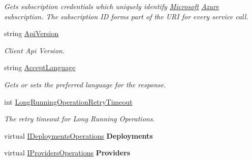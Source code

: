 \begin{DoxyCompactItemize}
\begin{DoxyCompactList}\small\item\em Gets subscription credentials which uniquely identify \hyperlink{namespace_microsoft}{Microsoft} \hyperlink{namespace_microsoft_1_1_azure}{Azure} subscription. The subscription ID forms part of the U\+RI for every service call. \end{DoxyCompactList}\item 
string \hyperlink{class_microsoft_1_1_azure_1_1_management_1_1_resources_1_1_resource_management_client_aea51a4e00dde5b781e6f692e1ae2bc46}{Api\+Version}
\begin{DoxyCompactList}\small\item\em Client Api Version. \end{DoxyCompactList}\item 
string \hyperlink{class_microsoft_1_1_azure_1_1_management_1_1_resources_1_1_resource_management_client_af3643c8e63b7c9f85c7c323f216f08c9}{Accept\+Language}
\begin{DoxyCompactList}\small\item\em Gets or sets the preferred language for the response. \end{DoxyCompactList}\item 
int \hyperlink{class_microsoft_1_1_azure_1_1_management_1_1_resources_1_1_resource_management_client_ad3b245357fb89a925bcec2c0cc6fe300}{Long\+Running\+Operation\+Retry\+Timeout}
\begin{DoxyCompactList}\small\item\em The retry timeout for Long Running Operations. \end{DoxyCompactList}\item 
virtual \hyperlink{interface_microsoft_1_1_azure_1_1_management_1_1_resources_1_1_i_deployments_operations}{I\+Deployments\+Operations} {\bfseries Deployments}\hypertarget{class_microsoft_1_1_azure_1_1_management_1_1_resources_1_1_resource_management_client_aaba91c1c3605e83d38a6a6f03f15c5e4}{}\label{class_microsoft_1_1_azure_1_1_management_1_1_resources_1_1_resource_management_client_aaba91c1c3605e83d38a6a6f03f15c5e4}

\item 
virtual \hyperlink{interface_microsoft_1_1_azure_1_1_management_1_1_resources_1_1_i_providers_operations}{I\+Providers\+Operations} {\bfseries Providers}\hypertarget{class_microsoft_1_1_azure_1_1_management_1_1_resources_1_1_resource_management_client_a0db61f31aa1e02dd057e99bb75c4ffe2}{}\label{class_microsoft_1_1_azure_1_1_management_1_1_resources_1_1_resource_management_client_a0db61f31aa1e02dd057e99bb75c4ffe2}


\end{DoxyCompactItemize}
